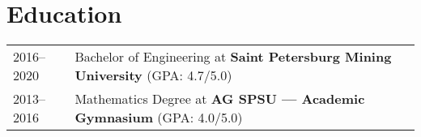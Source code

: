 \documentclass[a4paper,12pt]{article}
\begin{document}
    \section{Education}\label{sec:education}
    \begin{tabularx}{\linewidth}{@{}l X@{}}
        2016--2020 & Bachelor of Engineering at \textbf{Saint Petersburg Mining University} \hfill \normalsize (GPA: 4.7/5.0) \\
        2013--2016 & Mathematics Degree at \textbf{AG SPSU — Academic Gymnasium} \hfill (GPA: 4.0/5.0) \\
    \end{tabularx}

    \vfill
\end{document}
